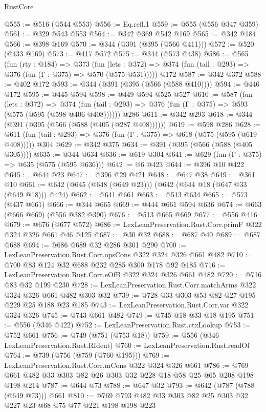 \begin{lexlean}{RustCore}
\begin{coremodule}
{\begin{coremodule}
{{{{{@555 := @516 (@544 @553)
@556 := Eq.refl.{1}
@559 := @555 (@556 @347 @359)
@561 := @329 @543 @553
@564 := @342 @369 @542 @169
@565 := @342 @184
@566 := @398 @169
@570 := @344 (@391 (@395 (@566 @411)))
@572 := @520 (@433 @169)
@573 := @417 @572
@575 := @344 (@573 @438)
@586 := @565
    (fun (rty : @184) =>
    @373
      (fun (lets : @372) => @374 (fun (tail : @293) => @376 (fun (Γ : @375) => @570 (@575 @531)))))
    @172
@587 := @342 @372
@588 := @402 @172
@593 := @344 (@391 (@395 (@566 (@588 @410))))
@594 := @446 @172
@595 := @445 @594
@598 := @449 @594 @525 @527
@610 := @587
    (fun (lets : @372) =>
    @374 (fun (tail : @293) => @376 (fun (Γ : @375) => @593 (@575 (@595 (@598 @406 @408))))))
    @286
@611 := @342 @293
@618 := @344 (@391 (@395 (@566 (@588 (@405 (@287 @408))))))
@619 := @598 @286
@628 := @611 (fun (tail : @293) => @376 (fun (Γ : @375) => @618 (@575 (@595 (@619 @408))))) @304
@629 := @342 @375
@634 := @391 (@395 (@566 (@588 (@405 @305))))
@635 := @344 @634
@636 := @619 @304
@641 := @629 (fun (Γ : @375) => @635 (@575 (@595 @636)))
@642 := @6 @423
@644 := @396 @10 @422
@645 := @644 @23
@647 := @396 @29 @421
@648 := @647 @38
@649 := @361 @10
@661 := @642 (@645 (@648 (@649 @23))) (@642 (@644 @18 (@647 @33 (@649 @18))) @424)
@662 := @641 @661
@663 := @513 @634
@665 := @573 (@437 @661)
@666 := @344 @665
@669 := @444 @661 @594 @636
@674 := @663 (@666 @669) (@556 @382 @390)
@676 := @513 @665 @669
@677 := @556 @416
@679 := @676 (@677 @572)
@686 := LexLeanPreservation.Rust.Corr.primF @322 @324 @326 @661 @46 @125
@687 := @30 @32
@688 := @687 @40
@689 := @687 @688
@694 := @686 @689 @32 @286 @301 @290
@700 := LexLeanPreservation.Rust.Corr.opsCons @322 @324 @326 @661 @482
@710 := @700 @83 @124 @32 @688 @232 @285 @300 @178 @92 @185
@716 := LexLeanPreservation.Rust.Corr.eOfB @322 @324 @326 @661 @482
@720 := @716 @83 @32 @199 @230
@728 := LexLeanPreservation.Rust.Corr.matchArms @322 @324 @326 @661 @482 @303 @32
@739 := @728 @33 @303 @53 @82 @27 @195 @229 @25 @188 @23 @185
@743 := LexLeanPreservation.Rust.Corr.var @322 @324 @326
@745 := @743 @661 @482
@749 := @745 @18 @33 @18 @195
@751 := @556 (@346 @422)
@752 := LexLeanPreservation.Rust.ctxLookup
@753 := @752 @661
@756 := @749 (@751 (@753 @18))
@759 := @556 (@346 LexLeanPreservation.Rust.RIdent)
@760 := LexLeanPreservation.Rust.readOf
@764 := @739 (@756 (@759 (@760 @195)))
@769 := LexLeanPreservation.Rust.Corr.mCons @322 @324 @326 @661
@786 := @769 @661 @482 @33 @303 @82 @26 @303 @32 @228 @18 @58 @25 @65 @208 @198 @198 @214
@787 := @644 @73
@788 := @647 @32
@793 := @642 (@787 (@788 (@649 @73))) @661
@810 := @769 @793 @482 @33 @303 @82 @25 @303 @32 @227 @23 @68 @75 @77 @221 @198 @198 @223
}}}}}
\end{coremodule}}
\end{coremodule}
\end{lexlean}

